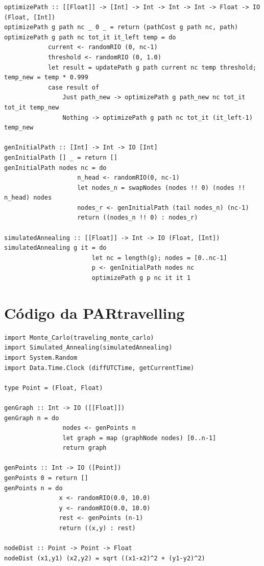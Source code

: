 \documentclass{article}
\begin{document}
\begin{appendices}
\begin{framed}
\begin{verbatim}
optimizePath :: [[Float]] -> [Int] -> Int -> Int -> Int -> Float -> IO (Float, [Int])
optimizePath g path nc _ 0 _ = return (pathCost g path nc, path)
optimizePath g path nc tot_it it_left temp = do
            current <- randomRIO (0, nc-1)
            threshold <- randomRIO (0, 1.0)
            let result = updatePath g path current nc temp threshold; temp_new = temp * 0.999
            case result of
                Just path_new -> optimizePath g path_new nc tot_it tot_it temp_new
                Nothing -> optimizePath g path nc tot_it (it_left-1) temp_new

genInitialPath :: [Int] -> Int -> IO [Int]
genInitialPath [] _ = return []
genInitialPath nodes nc = do
                    n_head <- randomRIO(0, nc-1)
                    let nodes_n = swapNodes (nodes !! 0) (nodes !! n_head) nodes
                    nodes_r <- genInitialPath (tail nodes_n) (nc-1)
                    return ((nodes_n !! 0) : nodes_r)

simulatedAnnealing :: [[Float]] -> Int -> IO (Float, [Int])
simulatedAnnealing g it = do
                        let nc = length(g); nodes = [0..nc-1]
                        p <- genInitialPath nodes nc
                        optimizePath g p nc it it 1
\end{verbatim}
\end{framed}

\section{Código da PARtravelling}

\begin{framed}
\begin{verbatim}
import Monte_Carlo(traveling_monte_carlo)
import Simulated_Annealing(simulatedAnnealing)
import System.Random
import Data.Time.Clock (diffUTCTime, getCurrentTime)

type Point = (Float, Float)

genGraph :: Int -> IO ([[Float]])
genGraph n = do
                nodes <- genPoints n
                let graph = map (graphNode nodes) [0..n-1]
                return graph

genPoints :: Int -> IO ([Point])
genPoints 0 = return []
genPoints n = do
               x <- randomRIO(0.0, 10.0)
               y <- randomRIO(0.0, 10.0)
               rest <- genPoints (n-1)
               return ((x,y) : rest)

nodeDist :: Point -> Point -> Float
nodeDist (x1,y1) (x2,y2) = sqrt ((x1-x2)^2 + (y1-y2)^2)


\end{verbatim}
\end{framed}
\end{appendices}
\end{document}
